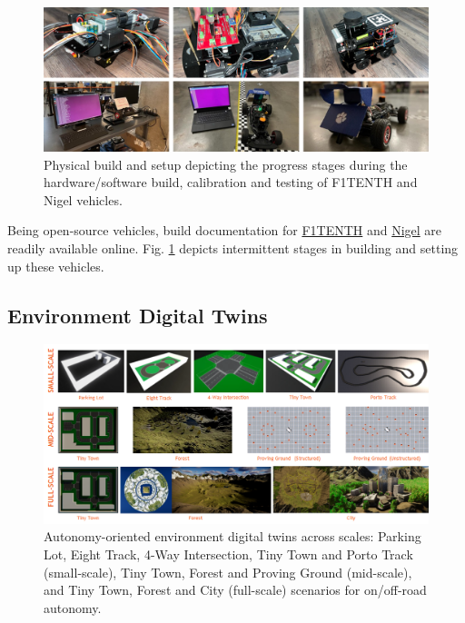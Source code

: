 \begin{figure}[h]
    \centering
    \includegraphics[width=\linewidth]{Figures/fig7.png}
    \caption{Physical build and setup depicting the progress stages during the hardware/software build, calibration and testing of F1TENTH and Nigel vehicles.}
    \label{fig: figure7}
\end{figure}

Being open-source vehicles, build documentation for \href{https://f1tenth.org/build.html}{F1TENTH} and \href{https://github.com/Tinker-Twins/AutoDRIVE/blob/AutoDRIVE-Testbed/Documents/Nigel - Assembly Guide.pdf}{Nigel} are readily available online. Fig. \ref{fig: figure7} depicts intermittent stages in building and setting up these vehicles.

\hypertarget{Environment Digital Twins}{%
\subsection{Environment Digital Twins}\label{Environment Digital Twins}}

\begin{figure}[h]
    \centering
    \includegraphics[width=\linewidth]{Figures/fig8.png}
    \caption{Autonomy-oriented environment digital twins across scales: Parking Lot, Eight Track, 4-Way Intersection, Tiny Town and Porto Track (small-scale), Tiny Town, Forest and Proving Ground (mid-scale), and Tiny Town, Forest and City (full-scale) scenarios for on/off-road autonomy.}
    \label{fig: figure8}
\end{figure}

